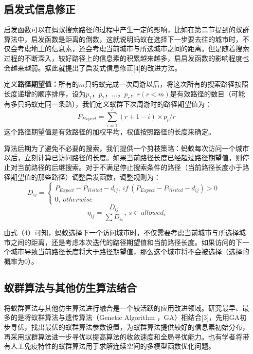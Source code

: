 \documentclass[a4paper,12pt]{report}
\begin{document}
\begin{spacing}{1.5}
\subsection{启发式信息修正}
	启发函数可以在蚂蚁搜索路径的过程中产生一定的影响，比如在第二节提到的蚁群算法中，启发函数是距离的倒数，这就说明蚂蚁在选择下一步要去往的城市时，不仅会考虑地上的信息素，还会考虑当前城市与所选城市之间的距离。但是随着搜索过程的不断深入，较好路径上的信息素的积累越来越多，启启发函数的影响程度也会越来越弱。据此就提出了启发式信息修正[4]的改进方法。
	
	定义\textbf{路径期望值：}所有的$m$只蚂蚁完成一次周游以后，将这次所有的搜索路径按照长度递增的顺序排序，设为$p_1$，$p_2$，$…$，$p_r$，$r(r<m)$是有效路径的数目（可能有多只蚂蚁走同一条路），我们定义蚁群下次周游时的路径期望值为：
	\begin{equation}
	P_{Expect}= \sum_{i=1}^{r} (r+1-i)\times p_i/r
	\end{equation}
这个路径期望值是有效路径的加权平均，权值按照路径的长度来确定。

	算法后期为了避免不必要的搜索，我们提供一个剪枝策略：蚂蚁每次访问一个城市以后，立刻计算已访问路径的长度。如果当前路径长度已经超过路径期望值，则停止对当前路径的后继搜索。对于不满足停止搜索条件的路径（当前路径长度小于路径期望值的那些路径）调整启发函数，调整规则为：
	\begin{equation}
		D_{ij} = \left\{  
			\begin{array}{lr}  
			   P_{Expect}-P_{Visited}-d_{ij},\ if \ (P_{Expect}-P_{Visited}-d_{ij})>0 &  \\  
			   0,\ otherwise    
			 \end{array}  
			 \right. 
	\end{equation}
	\begin{equation}
	\eta_{ij} = \frac{D_{ij}}{\sum D_{is}},\ s\subset allowed_i
	\end{equation}

	由式（4）可知，蚂蚁选择下一个访问城市时，不仅需要考虑当前城市与所选择城市之间的距离，还是考虑本次迭代的路径期望值和当前路径长度。如果访问的下一个城市导致当前路径长度将大于路径期望值，那么这个城市将不会被选择（选择的概率为0）。

\subsection{蚁群算法与其他仿生算法结合}
	将蚁群算法与其他仿生算法进行融合是一个较活跃的应用改进领域。研究最早、最多的是将蚁群算法与遗传算法（Genetic Algorithm ，GA）相结合[3]，先用GA初步寻优，找出最优的蚁群算法参数设置，为蚁群算法提供较好的信息素初始分布，再采用蚁群算法进一步寻优以提高算法的收敛速度和全局寻优能力。也有学者将带有人工免疫特性的蚁群算法用于求解连续空间的多模型函数优化问题。

\end{spacing}
\end{document}
